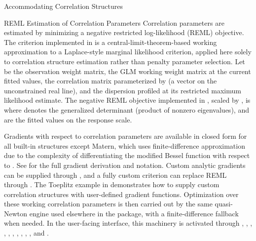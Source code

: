 \begin{Section}{Accommodating Correlation Structures}
%
\begin{SubSection}{REML Estimation of Correlation Parameters}
Correlation parameters \eqn{\boldsymbol{\theta}}{} are estimated by minimizing
a negative restricted log-likelihood (REML) objective. The criterion
implemented in  is a central-limit-theorem-based working
approximation to a Laplace-style marginal likelihood criterion,
applied here solely to correlation structure estimation rather than
penalty parameter selection.
Let  be the observation weight matrix,
 the GLM working weight
matrix at the current fitted values,  the correlation matrix
parameterized by \eqn{\boldsymbol{\rho}}{} (a vector on the unconstrained
real line), and  the dispersion profiled at its
restricted maximum likelihood estimate. The negative REML objective
implemented in , scaled by , is
where \eqn{|\cdot|^{+}}{} denotes the generalized determinant (product of
nonzero eigenvalues), and
 are
the fitted values on the response scale.

Gradients with respect to correlation parameters are available in
closed form for all built-in structures except Matern, which uses
finite-difference approximation due to the complexity of differentiating
the modified Bessel function  with respect to \eqn{\nu}{}. See
 for the full gradient derivation and
notation. Custom analytic gradients can be supplied through ,
and a fully custom criterion can replace REML through
. The Toeplitz example in 
demonstrates how to supply custom correlation structures with user-defined
gradient functions. Optimization over these working correlation parameters is
then carried out by the same quasi-Newton engine used elsewhere in the
package, with a finite-difference fallback when needed. In the user-facing interface, this
machinery is activated through ,
, , , ,
, , ,
, , and
.


\end{SubSection}
\end{Section}
